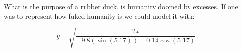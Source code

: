\documentclass[12pt, report]{article}
\title{}
\author{Stephen Okita or THE ARCTESIAN}
\date{October 12th. 2021}
\begin{document}
\begin{titlepage}
    \maketitle
\end{titlepage}
\begin{abstract}

\end{abstract}

\begin{center}
What is the purpose of a rubber duck, is humanity doomed by excesses. If one was to represent how fuked humanity is we could model it with: 
\end{center}
\[ y = \sqrt{\frac{2x}{-9.8(\sin(5.17))-0.14\cos(5.17)}}\]
\end{document}
